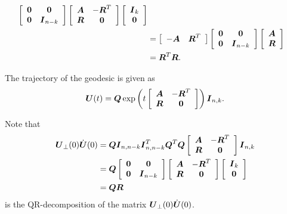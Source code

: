 \documentclass[11pt]{article}
\begin{document}
\begin{enumerate}
\begin{align*}
{\begin{array}{cc}
\end{array} }
\left[\begin{array}{cc}
\boldsymbol{0} & \boldsymbol{0} \\ 
\boldsymbol{0}& \boldsymbol{I}_{n-k}
\end{array} \right]\left[\begin{array}{cc}
\boldsymbol{A} & -\boldsymbol{R}^{T} \\ 
\boldsymbol{R}& \boldsymbol{0}
\end{array} \right]\left[\begin{array}{c}
\boldsymbol{I}_{k} \\ 
\boldsymbol{0}
\end{array} \right]\\
&= \left[\begin{array}{cc}
-\boldsymbol{A} & \boldsymbol{R}^{T} 
\end{array} \right]\left[\begin{array}{cc}
\boldsymbol{0} & \boldsymbol{0} \\ 
\boldsymbol{0}& \boldsymbol{I}_{n-k}
\end{array} \right]\left[\begin{array}{cc}
\boldsymbol{A} \\
 \boldsymbol{R}
\end{array} \right] \\
&=  \boldsymbol{R}^{T} \boldsymbol{R}. 
\end{align*} 



The trajectory of the geodesic is given as 
\begin{align}
\boldsymbol{U}(t) = \boldsymbol{Q}\exp\left(t\left[\begin{array}{cc}
\boldsymbol{A} & -\boldsymbol{R}^{T} \\ 
\boldsymbol{R}& \boldsymbol{0}
\end{array} \right]\right)\boldsymbol{I}_{n,k}. \label{eqn: geo_Stiefel_curve_2}
\end{align}

Note that
\begin{align*}
\boldsymbol{U}_{\bot}(0)\dot{\boldsymbol{U}}(0) 
&=  \boldsymbol{Q}\boldsymbol{I}_{n,n-k}\boldsymbol{I}_{n,n-k}^{T}\boldsymbol{Q}^{T}\boldsymbol{Q}\left[\begin{array}{cc}
\boldsymbol{A} & -\boldsymbol{R}^{T} \\ 
\boldsymbol{R}& \boldsymbol{0}
\end{array} \right]\boldsymbol{I}_{n,k}\\
&= \boldsymbol{Q}\left[\begin{array}{cc}
\boldsymbol{0} & \boldsymbol{0} \\ 
\boldsymbol{0} & \boldsymbol{I}_{n-k}
\end{array} \right]\left[\begin{array}{cc}
\boldsymbol{A} & -\boldsymbol{R}^{T} \\ 
\boldsymbol{R}& \boldsymbol{0}
\end{array} \right]\left[\begin{array}{c}
\boldsymbol{I}_{k} \\ 
\boldsymbol{0}
\end{array} \right]\\
&= \boldsymbol{Q}\boldsymbol{R}
\end{align*} is the QR-decomposition of the matrix $\boldsymbol{U}_{\bot}(0)\dot{\boldsymbol{U}}(0) $.  \citep{edelman1998geometry}\\



\end{enumerate}
\end{document}

